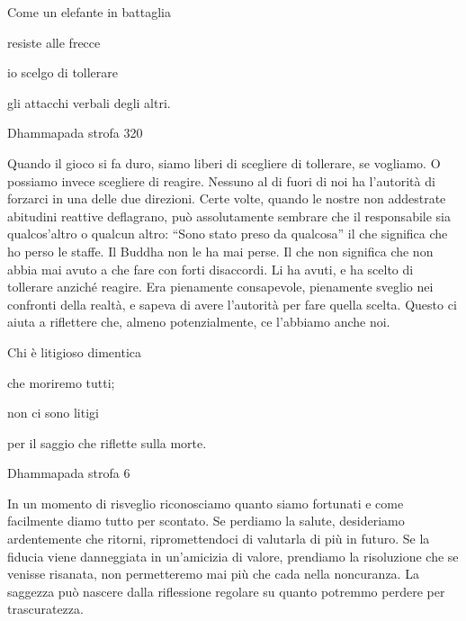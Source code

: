 \documentclass[a4paper,portrait,12pt]{article}
\begin{document}
Come un elefante in battaglia


resiste alle frecce	


io scelgo di tollerare


gli attacchi verbali degli altri.





Dhammapada strofa 320


\newpage



Quando il gioco si fa duro, siamo liberi di scegliere di tollerare, se vogliamo. O possiamo invece scegliere di reagire. Nessuno al di fuori di noi ha l'autorit\`{a} di forzarci in una delle due direzioni. Certe volte, quando le nostre non addestrate abitudini reattive deflagrano, pu\`{o} assolutamente sembrare che il responsabile sia qualcos'altro o qualcun altro: ``Sono stato preso da qualcosa'' il che significa che ho perso le staffe. Il Buddha non le ha mai perse. Il che non significa che non abbia mai avuto a che fare con forti disaccordi. Li ha avuti, e ha scelto di tollerare anzich\'{e} reagire. Era pienamente consapevole, pienamente sveglio nei confronti della realt\`{a}, e sapeva di avere l'autorit\`{a} per fare quella scelta. Questo ci aiuta a riflettere che, almeno potenzialmente, ce l'abbiamo anche noi.


\newpage



Chi \`{e} litigioso dimentica


che moriremo tutti; 


non ci sono litigi


per il saggio che riflette sulla morte.





Dhammapada strofa 6


\newpage



In un momento di risveglio riconosciamo quanto siamo fortunati e come facilmente diamo tutto per scontato. Se perdiamo la salute, desideriamo ardentemente che ritorni, ripromettendoci di valutarla di più in futuro. Se la fiducia viene danneggiata in un'amicizia di valore, prendiamo la risoluzione che se venisse risanata, non permetteremo mai più che cada nella noncuranza. La saggezza pu\`{o} nascere dalla riflessione regolare su quanto potremmo perdere per trascuratezza.


\newpage
\end{document}
